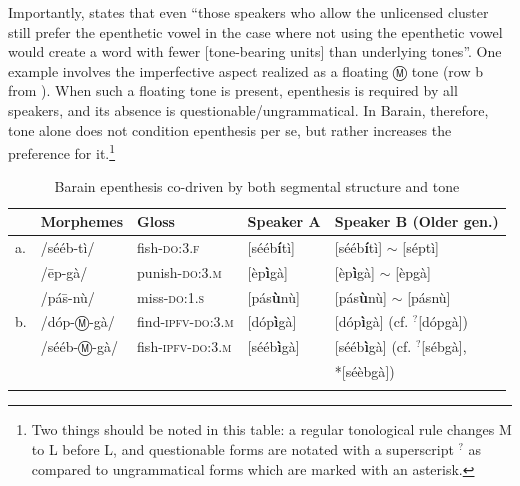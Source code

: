 \documentclass[output=paper,colorlinks,citecolor=brown,draft,draftmode]{langscibook}
\begin{document}
Importantly, \citet[63]{lovestrand_linguistic_2012} states that even ``those speakers who allow the unlicensed cluster still prefer the epenthetic vowel in the case where not using the epenthetic vowel would create a word with fewer [tone-bearing units] than underlying tones''. 
One example involves the imperfective aspect realized as a floating Ⓜ tone 
(row b from ).
When such a floating tone is present,  epenthesis is required by all speakers, and its absence is questionable/ungrammatical.
In Barain, therefore, tone alone does not condition epenthesis per se, but rather increases the preference for it.\footnote{Two things should be noted in this table: a regular tonological rule changes  M to L before  L, and questionable forms are notated with a superscript $^?$ as compared to ungrammatical forms which are marked with an asterisk.}


\begin{table}
\caption{Barain epenthesis co-driven by both segmental structure and tone \citep{lovestrand_linguistic_2012}}
\label{tab:barain}
 \begin{tabularx}{\textwidth}{llXll}
   \lsptoprule
     & Morphemes & Gloss & Speaker    A & Speaker B (Older gen.) \\
    \midrule
a. & /s\'{e}\'{e}b-t\`{i}/ & fish-\textsc{do:3.f} &   {[}s\'{e}\'{e}b\textbf{\'{i}}t\`{i}{]} &  {[}s\'{e}\'{e}b\textbf{\'{i}}t\`{i}{]}  $\sim$  {[}s\'{e}pt\`{i}{]} \\
 & /\={e}p-gà/ & punish-\textsc{do:3.m} &   {[}\`{e}p\textbf{\`{i}}gà{]} &   {[}\`{e}p\textbf{\`{i}}gà{]}  $\sim$    {[}\`{e}pgà{]}\\
 & /pás̄-n\`{u}/ & miss-\textsc{do:1.s} &   {[}pás\textbf{\`{u}}n\`{u}{]} & {[}pás\textbf{\`{u}}n\`{u}{]} $\sim$  {[}pásn\`{u}{]} \\
b. & /d\'{o}p-Ⓜ-gà/
 & find-\textsc{ipfv}-\textsc{do:3.m} &   {[}d\'{o}p\textbf{\`{i}}gà{]} & {[}d\'{o}p\textbf{\`{i}}gà{]} (cf. $^?${[}d\'{o}pgà{]})\\
 & /s\'{e}\'{e}b-Ⓜ-gà/
& fish-\textsc{ipfv}-\textsc{do:3.m} &   {[}s\'{e}\'{e}b\textbf{\`{i}}gà{]} & {[}s\'{e}\'{e}b\textbf{\`{i}}gà{]}   (cf. $^?${[}s\'{e}bgà{]}, \\
&&&&{ } { } { } { } { } { } { } { } { } { } { } *{[}s\'{e}\`{e}bgà{]}) \\
\lspbottomrule
\end{tabularx}
\end{table}
\end{document}
